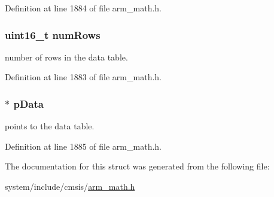 Definition at line 1884 of file arm\+\_\+math.\+h.

\subsubsection[{\texorpdfstring{num\+Rows}{numRows}}]{\setlength{\rightskip}{0pt plus 5cm}uint16\+\_\+t num\+Rows}\hypertarget{structarm__bilinear__interp__instance__q7_a1bcf80ccdc2acc29198f1592ae300390}{}\label{structarm__bilinear__interp__instance__q7_a1bcf80ccdc2acc29198f1592ae300390}
number of rows in the data table. 

Definition at line 1883 of file arm\+\_\+math.\+h.

\subsubsection[{\texorpdfstring{p\+Data}{pData}}]{$\ast$ p\+Data}\hypertarget{structarm__bilinear__interp__instance__q7_afde7546ea2ec5df9fe42fb04d128a016}{}\label{structarm__bilinear__interp__instance__q7_afde7546ea2ec5df9fe42fb04d128a016}
points to the data table. 

Definition at line 1885 of file arm\+\_\+math.\+h.



The documentation for this struct was generated from the following file\+:\begin{DoxyCompactItemize}
\item 
system/include/cmsis/\hyperlink{arm__math_8h}{arm\+\_\+math.\+h}\end{DoxyCompactItemize}
